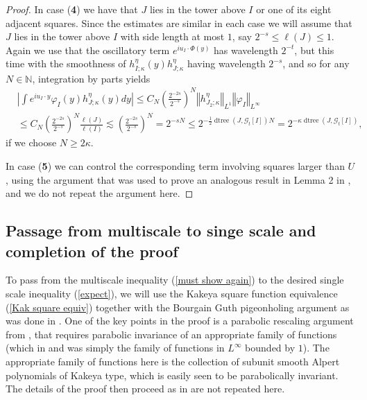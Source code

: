 \documentclass{amsart}%
\theoremstyle{plain}
\numberwithin{equation}{section}
\begin{document}
\begin{proof}
In case (\textbf{4}) we have that $J$ lies in the tower above $I$ or one of
its eight adjacent squares. Since the estimates are similar in each case we
will assume that $J$ lies in the tower above $I$ with side length at most $1$,
say $2^{-s}\leq\ell\left(  J\right)  \leq1$. Again we use that the oscillatory
term $e^{iu_{I}\cdot\Phi\left(  y\right)  }$ has wavelength $2^{-t}$, but this
time with the smoothness of $h_{I;\kappa}^{\eta}\left(  y\right)  h_{J;\kappa
}^{\eta}$ having wavelength $2^{-s}$, and so for any $N\in\mathbb{N}$,
integration by parts yields%
\begin{align*}
& \left\vert \int e^{iu_{I}\cdot y}\varphi_{I}\left(  y\right)  h_{J;\kappa
}^{\eta}\left(  y\right)  dy\right\vert \leq C_{N}\left(  \frac{2^{-2s}%
}{2^{-s}}\right)  ^{N}\left\Vert h_{J_{2};\kappa}^{\eta}\right\Vert _{L^{1}%
}\left\Vert \varphi_{I}\right\Vert _{L^{\infty}}\\
& \leq C_{N}\left(  \frac{2^{-2s}}{2^{-s}}\right)  ^{N}\frac{\ell\left(
J\right)  }{\ell\left(  I\right)  }\lesssim\left(  \frac{2^{-2s}}{2^{-s}%
}\right)  ^{N}=2^{-sN}\leq2^{-\frac{1}{2}\operatorname*{dtree}\left(
J,\mathcal{G}_{t}\left[  I\right]  \right)  N}=2^{-\kappa\operatorname*{dtree}%
\left(  J,\mathcal{G}_{t}\left[  I\right]  \right)  },
\end{align*}
if we choose $N\geq2\kappa$.

In case (\textbf{5}) we can control the corresponding term involving squares
larger than $U$, using the argument that was used to prove an analogous result
in Lemma 2 in \cite{Saw7}, and we do not repeat the argument here.
\end{proof}

\subsection{Passage from multiscale to singe scale and completion of the
proof}

To pass from the multiscale inequality (\ref{must show again}) to the desired
single scale inequality (\ref{expect}), we will use the Kakeya square function
equivalence (\ref{Kak square equiv}) together with the Bourgain Guth
pigeonholing argument as was done in \cite{RiSa2}. One of the key points in
the proof is a parabolic rescaling argument from \cite{TaVaVe}, that requires
parabolic invariance of an appropriate family of functions (which in
\cite{TaVaVe} and \cite{BoGu} was simply the family of functions in
$L^{\infty}$ bounded by $1$). The appropriate family of functions here is the
collection of subunit smooth Alpert polynomials of Kakeya type, which is
easily seen to be parabolically invariant. The details of the proof then
proceed as in \cite{RiSa2} are not repeated here.
\end{document}
